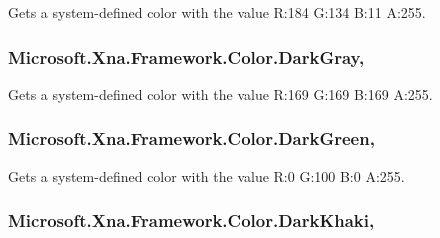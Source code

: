 Gets a system-\/defined color with the value R\+:184 G\+:134 B\+:11 A\+:255.

\hypertarget{struct_microsoft_1_1_xna_1_1_framework_1_1_color_a2c0971ddeac72175cb09dac0b019f2a1}{}
\subsubsection[{Dark\+Gray}]{ Microsoft.\+Xna.\+Framework.\+Color.\+Dark\+Gray\hspace{0.3cm}{\ttfamily [static]}, {\ttfamily [get]}}\label{struct_microsoft_1_1_xna_1_1_framework_1_1_color_a2c0971ddeac72175cb09dac0b019f2a1}


Gets a system-\/defined color with the value R\+:169 G\+:169 B\+:169 A\+:255.

\hypertarget{struct_microsoft_1_1_xna_1_1_framework_1_1_color_a0e718bf6fe87a6171cf7948d280db774}{}
\subsubsection[{Dark\+Green}]{ Microsoft.\+Xna.\+Framework.\+Color.\+Dark\+Green\hspace{0.3cm}{\ttfamily [static]}, {\ttfamily [get]}}\label{struct_microsoft_1_1_xna_1_1_framework_1_1_color_a0e718bf6fe87a6171cf7948d280db774}


Gets a system-\/defined color with the value R\+:0 G\+:100 B\+:0 A\+:255.

\hypertarget{struct_microsoft_1_1_xna_1_1_framework_1_1_color_a6ab7caf490efb002ce06b7b8fca6fb46}{}
\subsubsection[{Dark\+Khaki}]{ Microsoft.\+Xna.\+Framework.\+Color.\+Dark\+Khaki\hspace{0.3cm}{\ttfamily [static]}, {\ttfamily [get]}}\label{struct_microsoft_1_1_xna_1_1_framework_1_1_color_a6ab7caf490efb002ce06b7b8fca6fb46}


